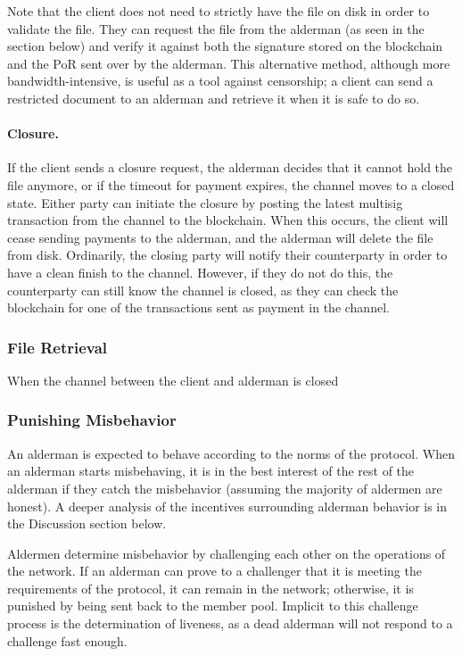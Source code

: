 \documentclass{article}
\begin{document}
Note that the client does not need to strictly have the file on disk in order to
validate the file. They can request the file from the alderman (as seen in the
section below) and verify it against both the signature stored on the
blockchain and the PoR sent over by the alderman. This alternative method,
although more bandwidth-intensive, is useful as a tool against censorship; a
client can send a restricted document to an alderman and retrieve it when it is
safe to do so.

\paragraph{Closure.} If the client sends a closure request, the alderman decides
that it cannot hold the file anymore, or if the timeout for payment expires, the
channel moves to a closed state. Either party can initiate the closure by
posting the latest multisig transaction from the channel to the blockchain. When
this occurs, the client will cease sending payments to the alderman, and the
alderman will delete the file from disk. Ordinarily, the closing party will
notify their counterparty in order to have a clean finish to the channel.
However, if they do not do this, the counterparty can still know the channel is
closed, as they can check the blockchain for one of the transactions sent as
payment in the channel.

\subsubsection{File Retrieval}

When the channel between the client and alderman is closed

\subsubsection{Punishing Misbehavior}

An alderman is expected to behave according to the norms of the protocol. When
an alderman starts misbehaving, it is in the best interest of the rest of the
alderman if they catch the misbehavior (assuming the majority of aldermen are
honest). A deeper analysis of the incentives surrounding alderman behavior is in
the Discussion section below.

Aldermen determine misbehavior by challenging each other on the operations of
the network. If an alderman can prove to a challenger that it is meeting the
requirements of the protocol, it can remain in the network; otherwise, it is
punished by being sent back to the member pool. Implicit to this challenge
process is the determination of liveness, as a dead alderman will not respond to
a challenge fast enough.
\end{document}
